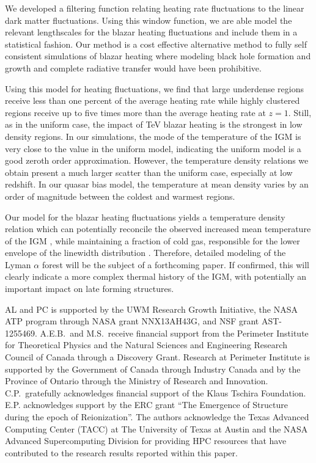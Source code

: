\documentclass[twocolumns]{emulateapj}
\begin{document}
We developed a filtering function relating heating rate fluctuations to the linear dark matter fluctuations. Using this window function, we are able model the relevant lengthscales for the blazar heating fluctuations and include them in a statistical fashion. Our method is a cost effective alternative method to fully self consistent simulations of blazar heating where modeling black hole formation and growth and complete radiative transfer would have been prohibitive. 

Using this model for heating fluctuations, we find that large underdense regions receive less than one percent of the average heating rate while highly clustered regions receive up to five times more than the average heating rate at $z=1$. Still, as in the uniform case, the impact of TeV blazar heating is the strongest in low density regions. In our simulations, the mode of the temperature of the IGM is very close to the value in the uniform model, indicating the uniform model is a good zeroth order approximation. However, the temperature density relations we obtain present a much larger scatter than the uniform case, especially at low redshift. In our quasar bias model, the temperature at mean density varies by an order of magnitude between the coldest and warmest regions. 

Our model for the blazar heating fluctuations yields a temperature density relation which can potentially reconcile the observed increased mean temperature of the IGM \citep{2014MNRAS.441.1916B}, while maintaining a fraction of cold gas, responsible for the lower envelope of the linewidth distribution \citep{2012ApJ...757L..30R}. Therefore, detailed modeling of the Lyman $\alpha$ forest will be the subject of a forthcoming paper. If confirmed, this will clearly indicate a more complex  thermal history of the IGM, with potentially an important impact on late forming structures. 



\begin{acknowledgements}
AL and PC is supported by the UWM Research Growth Initiative, the NASA ATP
program through NASA grant NNX13AH43G, and NSF grant AST-1255469. 
A.E.B.~and M.S.~receive financial support from the Perimeter
Institute for Theoretical Physics and the Natural Sciences and
Engineering Research Council of Canada through a Discovery Grant.
Research at Perimeter Institute is supported by the Government of
Canada through Industry Canada and by the Province of Ontario through
the Ministry of Research and Innovation.
C.P.~gratefully acknowledges
financial support of the Klaus Tschira Foundation. E.P. acknowledges support by the ERC grant ``The Emergence of Structure during the epoch of Reionization''.
The authors acknowledge the Texas Advanced Computing Center (TACC) at The University of Texas at Austin and the NASA Advanced Supercomputing Division for providing HPC resources that have contributed to the research results reported within this paper. 
\end{acknowledgements}
\end{document}
